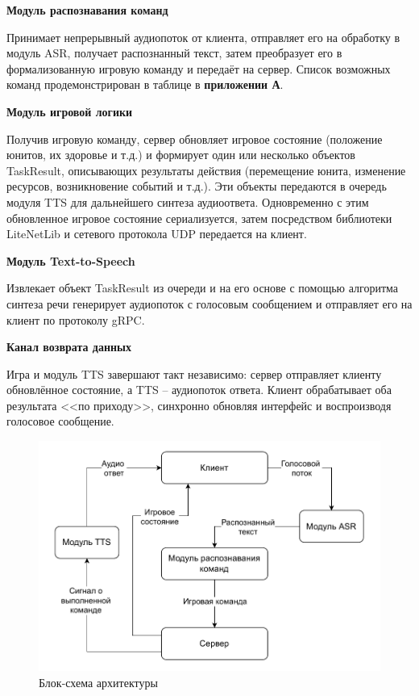         \textbf{Модуль распознавания команд}
        
        Принимает непрерывный аудиопоток от клиента, отправляет его на обработку в модуль ASR, 
        получает распознанный текст, затем преобразует его в формализованную игровую команду и передаёт на сервер.
        Список возможных команд продемонстрирован в таблице в \textbf{приложении А}.

        \textbf{Модуль игровой логики}

        Получив игровую команду, сервер обновляет игровое состояние (положение юнитов, их здоровье и т.д.) и формирует один или 
        несколько объектов TaskResult, описывающих результаты действия (перемещение юнита, изменение ресурсов, возникновение событий и т.д.).
        Эти объекты передаются в очередь модуля TTS для дальнейшего синтеза аудиоответа. Одновременно с этим обновленное игровое состояние
        сериализуется, затем посредством библиотеки LiteNetLib и сетевого протокола UDP передается на клиент.

        \textbf{Модуль Text-to-Speech}
        
        Извлекает объект TaskResult из очереди и на его основе с помощью алгоритма синтеза речи генерирует аудиопоток с голосовым сообщением и
        отправляет его на клиент по протоколу gRPC.

        \textbf{Канал возврата данных}
        
        Игра и модуль TTS завершают такт независимо: сервер отправляет клиенту обновлённое состояние, а TTS -- аудиопоток ответа. 
        Клиент обрабатывает оба результата <<по приходу>>, синхронно обновляя интерфейс и воспроизводя голосовое сообщение.
        

        \begin{figure}[H]
            \centering
            \includegraphics[scale=1]{pictures/architecture_scheme.pdf}
            \caption{Блок-схема архитектуры}\label{ris1.1}
        \end{figure}

